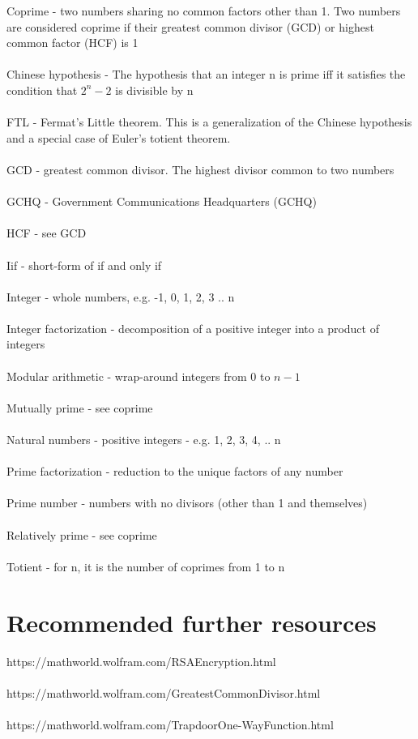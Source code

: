 \documentclass[11pt]{article}   	%
\begin{document}
Coprime - two numbers sharing no common factors other than 1. Two numbers are considered coprime if their greatest common divisor (GCD) or highest common factor (HCF) is 1 \\
\\
Chinese hypothesis - The hypothesis that an integer n is prime iff it satisfies the condition that $ 2^n - 2 $ is divisible by n \\
\\
FTL - Fermat's Little theorem. This is a generalization of the Chinese hypothesis and a special case of Euler's totient theorem. \\
\\
GCD - greatest common divisor. The highest divisor common to two numbers \\
\\
GCHQ - Government Communications Headquarters (GCHQ) \\
\\
HCF - see GCD \\
\\
Iif - short-form of if and only if \\
\\
Integer - whole numbers, e.g. -1, 0, 1, 2, 3 .. n \\
\\
Integer factorization - decomposition of a positive integer into a product of integers \\
\\
Modular arithmetic - wrap-around integers from 0 to $ n - 1 $ \\
\\
Mutually prime - see coprime \\
\\
Natural numbers - positive integers - e.g. 1, 2, 3, 4, .. n \\
\\
Prime factorization - reduction to the unique factors of any number \\
\\
Prime number - numbers with no divisors (other than 1 and themselves) \\
\\
Relatively prime - see coprime \\
\\
Totient - for n, it is the number of coprimes from 1 to n \\

\break


\section*{Recommended further resources}

https://mathworld.wolfram.com/RSAEncryption.html \\
\\
https://mathworld.wolfram.com/GreatestCommonDivisor.html \\
\\
https://mathworld.wolfram.com/TrapdoorOne-WayFunction.html
\end{document}
